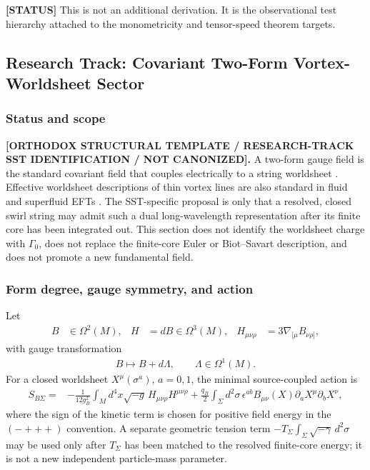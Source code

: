\textbf{[STATUS]} This is not an additional derivation. It is the observational
test hierarchy attached to the monometricity and tensor-speed theorem targets.


\subsection{Research Track: Covariant Two-Form Vortex-Worldsheet Sector}
\label{sec:rt_covariant_two_form_worldsheet}

\subsubsection{Status and scope}

\textbf{[ORTHODOX STRUCTURAL TEMPLATE / RESEARCH-TRACK SST IDENTIFICATION / NOT CANONIZED].}
A two-form gauge field is the standard covariant field that couples electrically
to a string worldsheet \cite{KalbRamond1974}.  Effective worldsheet descriptions
of thin vortex lines are also standard in fluid and superfluid EFTs
\cite{HornNicolisPenco2015}.  The SST-specific proposal is only that a resolved,
closed swirl string may admit such a dual long-wavelength representation after
its finite core has been integrated out.  This section does not identify the
worldsheet charge with \(\Gamma_0\), does not replace the finite-core Euler or
Biot--Savart description, and does not promote a new fundamental field.

\subsubsection{Form degree, gauge symmetry, and action}

Let
\begin{align}
    B&\in\Omega^2(M),
    &
    H&=dB\in\Omega^3(M),
    &
    H_{\mu\nu\rho}&=3\nabla_{[\mu}B_{\nu\rho]},
    \label{eq:rt_two_form_definitions}
\end{align}
with gauge transformation
\begin{align}
    B\mapsto B+d\Lambda,
    \qquad
    \Lambda\in\Omega^1(M).
    \label{eq:rt_two_form_gauge}
\end{align}
For a closed worldsheet \(X^\mu(\sigma^a)\), \(a=0,1\), the minimal
source-coupled action is
\begin{align}
    S_{B\Sigma}
    ={}&
    -\frac{1}{12g_B^2}
    \int_M d^4x\sqrt{-g}\,
    H_{\mu\nu\rho}H^{\mu\nu\rho}
    +
    \frac{q_B}{2}
    \int_\Sigma d^2\sigma\,
    \epsilon^{ab}
    B_{\mu\nu}(X)
    \partial_aX^\mu\partial_bX^\nu,
    \label{eq:rt_two_form_worldsheet_action}
\end{align}
where the sign of the kinetic term is chosen for positive field energy in the
\((-+++ )\) convention.  A separate geometric tension term
\(-T_\Sigma\int_\Sigma\sqrt{-\gamma}\,d^2\sigma\) may be used only after
\(T_\Sigma\) has been matched to the resolved finite-core energy; it is not a
new independent particle-mass parameter.

